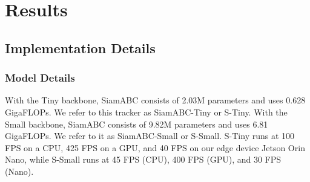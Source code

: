 \chapter{Results} %







  





  

  
  \label{sec:implementation}
  
  \section{Implementation Details}
  \subsection{Model Details}
  With the Tiny backbone, SiamABC consists of 2.03M parameters and uses 0.628 GigaFLOPs. We refer to this tracker as SiamABC-Tiny or S-Tiny. With the Small backbone, SiamABC consists of 9.82M parameters and uses 6.81 GigaFLOPs. We refer to it as SiamABC-Small or S-Small. S-Tiny runs at 100 FPS on a CPU, 425 FPS on a GPU, and 40 FPS on our edge device Jetson Orin Nano, while S-Small runs at 45 FPS (CPU), 400 FPS (GPU), and 30 FPS (Nano). 
  
  

